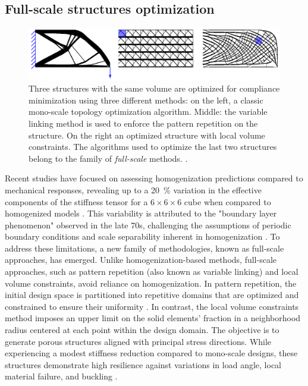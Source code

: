 \subsection{Full-scale structures optimization}
\begin{figure}
    \centering
    \includegraphics[width=0.8\linewidth]{figures/02_literature/full-to.png}
    \caption{Three structures with the same volume are optimized for compliance minimization using three different methods: on the left, a classic mono-scale topology optimization algorithm. Middle: the variable linking method is used to enforce the pattern repetition on the structure. On the right an optimized structure with local volume constraints. The algorithms used to optimize the last two structures belong to the family of \textit{full-scale} methods. \cite{wu_topology_2021}.}
    \label{fig:02_full-to}
\end{figure}

Recent studies have focused on assessing homogenization predictions compared to mechanical responses, revealing up to a \qty{20}{\percent} variation in the effective components of the stiffness tensor for a $6\times6\times6$ cube when compared to homogenized models . This variability is attributed to the "boundary layer phenomenon" observed in the late 70s, challenging the assumptions of periodic boundary conditions and scale separability inherent in homogenization . To address these limitations, a new family of methodologies, known as full-scale approaches, has emerged. Unlike homogenization-based methods, full-scale approaches, such as pattern repetition (also known as variable linking) and local volume constraints, avoid reliance on homogenization. In pattern repetition, the initial design space is partitioned into repetitive domains that are optimized and constrained to ensure their uniformity . In contrast, the local volume constraints method imposes an upper limit on the solid elements' fraction in a neighborhood radius centered at each point within the design domain. The objective is to generate porous structures aligned with principal stress directions. While experiencing a modest stiffness reduction compared to mono-scale designs, these structures demonstrate high resilience against variations in load angle, local material failure, and buckling .

